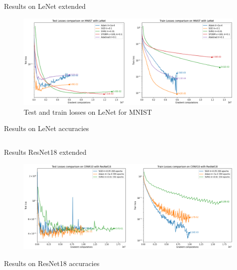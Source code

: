 \documentclass[10pt]{beamer}
\begin{document}
\begin{frame}{Results on LeNet extended}
    \begin{figure}
        \centering
        \includegraphics[width=\textwidth]{report/figures/MNIST.png}
        \caption{Test and train losses on LeNet for MNIST}
    \end{figure}
\end{frame}

\begin{frame}{Results on LeNet accuracies}
    \begin{table}[h]
    \begin{center}
        \begin{tabular}{||c | c | c||}
             \hline
             
        \end{tabular}
    \end{center}
    \end{table}
\end{frame}

\begin{frame}{Results ResNet18 extended}
    \begin{figure}
        \centering
        \includegraphics[width=\textwidth]{report/figures/CIFAR10.png}
    \end{figure}
\end{frame}

\begin{frame}{Results on ResNet18 accuracies}
    \begin{table}[h]
    \begin{center}
        \begin{tabular}{||c | c | c||}
             \hline
             
        \end{tabular}
    \end{center}
    \end{table}
\end{frame}
\end{document}
